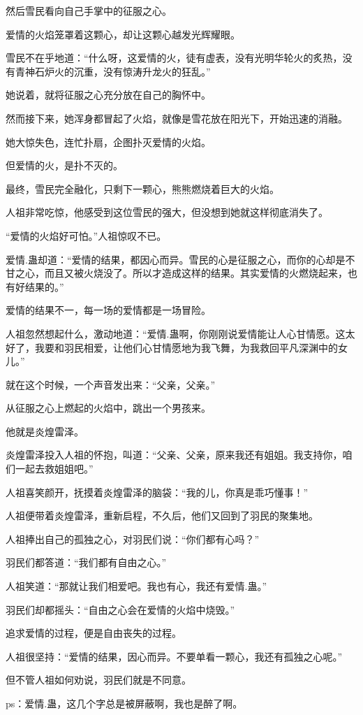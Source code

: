 \begin{this_body}
然后雪民看向自己手掌中的征服之心。

爱情的火焰笼罩着这颗心，却让这颗心越发光辉耀眼。

雪民不在乎地道：“什么呀，这爱情的火，徒有虚表，没有光明华轮火的炙热，没有青神石炉火的沉重，没有惊涛升龙火的狂乱。”

她说着，就将征服之心充分放在自己的胸怀中。

然而接下来，她浑身都冒起了火焰，就像是雪花放在阳光下，开始迅速的消融。

她大惊失色，连忙扑扇，企图扑灭爱情的火焰。

但爱情的火，是扑不灭的。

最终，雪民完全融化，只剩下一颗心，熊熊燃烧着巨大的火焰。

人祖非常吃惊，他感受到这位雪民的强大，但没想到她就这样彻底消失了。

“爱情的火焰好可怕。”人祖惊叹不已。

爱情.蛊却道：“爱情的结果，都因心而异。雪民的心是征服之心，而你的心却是不甘之心，而且又被火烧没了。所以才造成这样的结果。其实爱情的火燃烧起来，也有好结果的。”

爱情的结果不一，每一场的爱情都是一场冒险。

人祖忽然想起什么，激动地道：“爱情.蛊啊，你刚刚说爱情能让人心甘情愿。这太好了，我要和羽民相爱，让他们心甘情愿地为我飞舞，为我救回平凡深渊中的女儿。”

就在这个时候，一个声音发出来：“父亲，父亲。”

从征服之心上燃起的火焰中，跳出一个男孩来。

他就是炎煌雷泽。

炎煌雷泽投入人祖的怀抱，叫道：“父亲、父亲，原来我还有姐姐。我支持你，咱们一起去救姐姐吧。”

人祖喜笑颜开，抚摸着炎煌雷泽的脑袋：“我的儿，你真是乖巧懂事！”

人祖便带着炎煌雷泽，重新启程，不久后，他们又回到了羽民的聚集地。

人祖捧出自己的孤独之心，对羽民们说：“你们都有心吗？”

羽民们都答道：“我们都有自由之心。”

人祖笑道：“那就让我们相爱吧。我也有心，我还有爱情.蛊。”

羽民们却都摇头：“自由之心会在爱情的火焰中烧毁。”

追求爱情的过程，便是自由丧失的过程。

人祖很坚持：“爱情的结果，因心而异。不要单看一颗心，我还有孤独之心呢。”

但不管人祖如何劝说，羽民们就是不同意。

ps：爱情.蛊，这几个字总是被屏蔽啊，我也是醉了啊。

\end{this_body}

